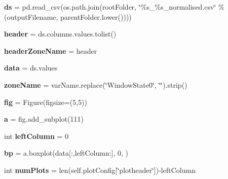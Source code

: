 \begin{DoxyCompactItemize}
\mbox{\label{class_f_plots_1_1_frm_plots_a4ab47e54c2f73ad4c0eb3974709721cd}} 
{\bfseries ds} = pd.\+read\+\_\+csv(os.\+path.\+join(root\+Folder, \char`\"{}\%s\+\_\+\%s\+\_\+normalised.\+csv\char`\"{} \% (output\+Filename, parent\+Folder.\+lower())))
\item 
\mbox{\label{class_f_plots_1_1_frm_plots_ae8f626807b2dddc1872b3005556939cd}} 
{\bfseries header} = ds.\+columns.\+values.\+tolist()
\item 
\mbox{\label{class_f_plots_1_1_frm_plots_a224196d18be36e9e722220e680cb0037}} 
{\bfseries header\+Zone\+Name} = header
\item 
\mbox{\label{class_f_plots_1_1_frm_plots_a511ae0b1c13f95e5f08f1a0dd3da3d93}} 
{\bfseries data} = ds.\+values
\item 
\mbox{\label{class_f_plots_1_1_frm_plots_a5cadf35a14ed9bb966a44c4e7b6c0f7f}} 
{\bfseries zone\+Name} = var\+Name.\+replace(\char`\"{}Window\+State0\char`\"{}, \char`\"{}\char`\"{}).strip()
\item 
\mbox{\label{class_f_plots_1_1_frm_plots_a64aa603bc3c6c1587e7c6542452481ac}} 
{\bfseries fig} = Figure(figsize=(5,5))
\item 
\mbox{\label{class_f_plots_1_1_frm_plots_a4124bc0a9335c27f086f24ba207a4912}} 
{\bfseries a} = fig.\+add\+\_\+subplot(111)
\item 
\mbox{\label{class_f_plots_1_1_frm_plots_afe35f80ea3d374f6d4c0e62e2153cae1}} 
int {\bfseries left\+Column} = 0
\item 
\mbox{\label{class_f_plots_1_1_frm_plots_ab03632e190331f379668603ee46d4772}} 
{\bfseries bp} = a.\+boxplot(data\mbox{[}\+:,left\+Column\+:\mbox{]}, 0, \textquotesingle{}\textquotesingle{})
\item 
\mbox{\label{class_f_plots_1_1_frm_plots_a7df049896d57c9f467e146a57f030751}} 
int {\bfseries num\+Plots} = len(self.\+plot\+Config\mbox{[}\char`\"{}plotheader\char`\"{}\mbox{]})-\/left\+Column

\end{DoxyCompactItemize}
